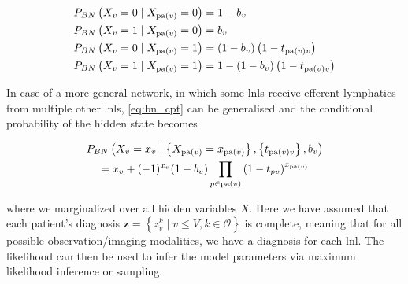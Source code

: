 \documentclass[../ms.tex]{subfiles}
\begin{document}
\begin{equation} \label{eq:bn_cpt}
    \begin{aligned}
        P_{BN} \left( X_v = 0 \mid X_{\operatorname{pa}(v)} = 0 \right) &= 1 - b_v \\
        P_{BN} \left( X_v = 1 \mid X_{\operatorname{pa}(v)} = 0 \right) &= b_v \\
        P_{BN} \left( X_v = 0 \mid X_{\operatorname{pa}(v)} = 1 \right) &= (1 - b_v) \left(1 - t_{\operatorname{pa}(v)v}\right) \\
        P_{BN} \left( X_v = 1 \mid X_{\operatorname{pa}(v)} = 1 \right) &= 1 - (1 - b_v) \left(1 - t_{\operatorname{pa}(v)v}\right) 
    \end{aligned}
\end{equation}

In case of a more general network, in which some \glspl{lnl} receive efferent lymphatics from multiple other \glspl{lnl}, \cref{eq:bn_cpt} can be generalised and the conditional probability of the hidden state becomes

\begin{multline}
    P_{BN} \left( X_v = x_v \mid \left\{ X_{\operatorname{pa}(v)} = x_{\operatorname{pa}(v)} \right\}, \left\{ t_{\operatorname{pa}(v)v} \right\} , b_v \right) \\
    = x_v + (-1)^{x_v} (1 - b_v) \prod_{p \in \operatorname{pa}(v)}{\left( 1 - t_{pv} \right)}^{x_{\operatorname{pa}(v)}}
\end{multline}

where we marginalized over all hidden variables $X$. Here we have assumed that each patient's diagnosis $\mathbf{z} = \left\{ z_v^k \mid v \leq V, k \in \mathcal{O} \right\}$ is complete, meaning that for all possible observation/imaging modalities, we have a diagnosis for each \gls{lnl}. The likelihood can then be used to infer the model parameters via maximum likelihood inference or sampling.
\end{document}
